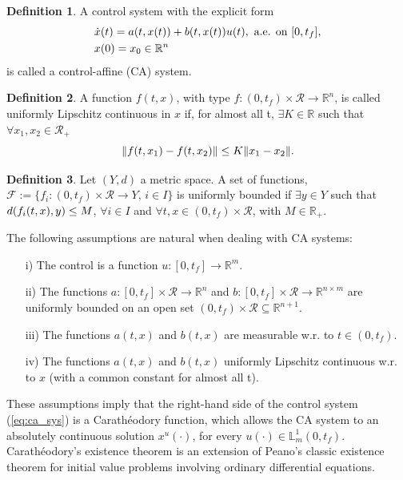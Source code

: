 \documentclass[11pt,letterpaper]{article}
\newcommand{\LL}{{\mathbb{L}}}
\newcommand{\RR}{{\mathbb{R}}}
\newcommand{\F}{{\mathcal{F}}}
\newcommand{\R}{{\mathcal{R}}}
\let\originalleft\left
\let\originalright\right
\renewcommand{\left}{\mathopen{}\mathclose\bgroup\originalleft}
\renewcommand{\right}{\aftergroup\egroup\originalright}
\newcommand{\norm}[1]{\left\lVert#1\right\rVert}
\theoremstyle{definition}
\newtheorem{definition}{Definition}[section]
\begin{document}
\begin{definition}
A control system with the explicit form
\begin{equation}\label{eq:ca_sys}
    \begin{split}
    &\dot{x}(t)=a\left(t,x(t)\right) + b\left(t,x(t)\right)u(t), \ \text{a.e. on } [0, t_f],\\
    &x(0)=x_0\in\RR^n
    \end{split}
\end{equation}
is called a control-affine (CA) system.
\end{definition}

\begin{definition}
A function $f(t,x)$, with type $f:(0,t_f)\times\R\rightarrow\RR^n$, is called uniformly Lipschitz continuous in $x$ if, for almost all t, $\exists K\in \RR$ such that $\forall x_1,x_2\in\R_+$
\begin{equation}
    \norm{f(t,x_1)-f(t,x_2)}\leq K\norm{x_1-x_2}.
\end{equation}
\end{definition}

\begin{definition}
Let $(Y, d)$ a metric space. A set of functions, $\F:=\{f_i:(0,t_f)\times\mathcal{R}\rightarrow Y,\,i\in I\}$ is uniformly bounded if $\exists y\in Y$ such that $d\left(f_i(t,x),y\right)\leq M$, $\forall i\in I$ and $\forall t,x\in(0,t_f)\times\R$, with $M\in\RR_+$.
\end{definition}

The following assumptions are natural when dealing with CA systems: 
\begin{enumerate}
    \item[i)] The control is a function $u:[0,t_f]\rightarrow\RR^m$.
    \item[ii)] The functions $a:[0,t_f]\times\R\rightarrow\RR^n$ and $b:[0,t_f]\times\R\rightarrow\RR^{n\times m}$ are uniformly bounded on an open set $(0,t_f)\times\R\subseteq\RR^{n+1}$.
    \item[iii)] The functions $a(t,x)$ and $b(t,x)$ are measurable w.r. to $t\in(0,t_f)$.
    \item[iv)] The functions $a(t,x)$ and $b(t,x)$ uniformly Lipschitz continuous w.r. to $x$ (with a common constant for almost all t).
\end{enumerate}
These assumptions imply that the right-hand side of the control system (\ref{eq:ca_sys}) is a Carathéodory function, which allows the CA system to an absolutely continuous solution $x^u(\cdot)$, for every $u(\cdot)\in\LL^1_m(0,t_f)$. Carathéodory's existence theorem is an extension of Peano's classic existence theorem for initial value problems involving ordinary differential equations.
\end{document}

